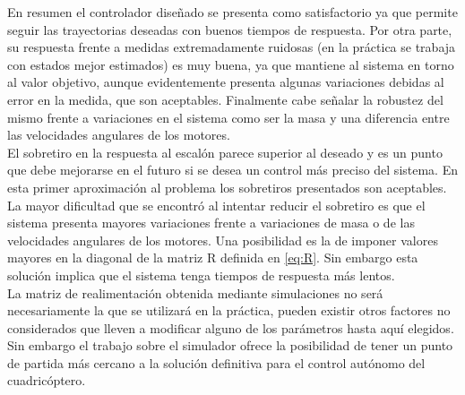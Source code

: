 \documentclass[main]{subfiles}
\begin{document}
En resumen el controlador diseñado se presenta como satisfactorio ya que permite seguir las trayectorias deseadas con buenos tiempos de respuesta. Por otra parte, su respuesta frente a medidas extremadamente ruidosas (en la pr\'actica se trabaja con estados mejor estimados) es muy buena, ya que mantiene al sistema en torno al valor objetivo, aunque evidentemente presenta algunas variaciones debidas al error en la medida, que son aceptables. Finalmente cabe señalar la robustez del mismo frente a variaciones en el sistema como ser la masa y una diferencia entre las velocidades angulares de los motores.\\

El sobretiro en la respuesta al escal\'on parece superior al deseado y es un punto que debe mejorarse en el futuro si se desea un control m\'as preciso del sistema. En esta primer aproximaci\'on al problema los sobretiros presentados son aceptables. La mayor dificultad que se encontr\'o al intentar reducir el sobretiro es que el sistema presenta mayores variaciones frente a variaciones de masa o de las velocidades angulares de los motores. Una posibilidad es la de imponer valores mayores en la diagonal de la matriz R definida en \ref{eq:R}. Sin embargo esta soluci\'on implica que el sistema tenga tiempos de respuesta m\'as lentos.\\

La matriz de realimentaci\'on obtenida mediante simulaciones no ser\'a necesariamente la que se utilizar\'a en la pr\'actica, pueden existir otros factores no considerados que lleven a modificar alguno de los par\'ametros hasta aqu\'i elegidos. Sin embargo el trabajo sobre el simulador ofrece la posibilidad de tener un punto de partida m\'as cercano a la soluci\'on definitiva para el control aut\'onomo del cuadric\'optero.\\
 
\end{document}
